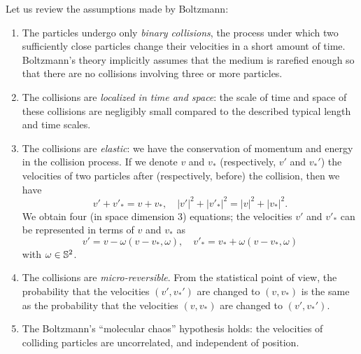 Let us review the assumptions made by Boltzmann:
\begin{enumerate}
	\item The particles undergo only \textit{binary collisions}, the process under which two sufficiently close particles change their velocities in a short amount of time. Boltzmann's theory implicitly assumes that the medium is rarefied enough so that there are no collisions involving three or more particles.

	\item The collisions are \textit{localized in time and space}: the scale of time and space of these collisions are negligibly small compared to the described typical length and time scales.

	\item The collisions are \textit{elastic}: we have the conservation of momentum and energy in the collision process. If we denote $v$ and $v_*$ (respectively, $v'$ and $v_*'$) the velocities of two particles after (respectively, before) the collision, then we have
	\[ 	 v'+v'_\ast=v +v _\ast ,\quad|v'|^2+|v'_\ast|^2=|v|^2 +|v _\ast|^2.  \]
	We obtain four (in space dimension $3$) equations; the velocities  $v'$ and $v'_*$ can be represented in terms of $v$ and $v_*$ as
	\[v' = v-\omega (v-v_\ast,\omega),\quad v'_\ast= v_\ast+\omega (v-v_\ast,\omega)\]
	with $\omega\in {\mathbb {S}^2}$.

	\item The collisions are \textit{micro-reversible}. From the statistical point of view, the probability that the velocities $(v',v_*')$ are changed to $(v,v_*)$ is the same as the probability that the velocities $(v,v_*)$ are changed to  $(v',v_*')$.

	\item The Boltzmann's \enquote{molecular chaos} hypothesis holds: the velocities of colliding particles are uncorrelated, and independent of position.
	
\end{enumerate}

